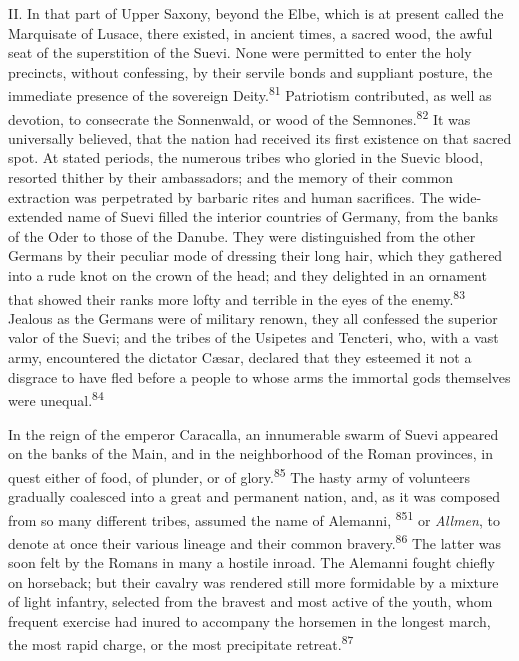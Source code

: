

II. In that part of Upper Saxony, beyond the Elbe, which is at
present called the Marquisate of Lusace, there existed, in
ancient times, a sacred wood, the awful seat of the superstition
of the Suevi. None were permitted to enter the holy precincts,
without confessing, by their servile bonds and suppliant posture,
the immediate presence of the sovereign Deity.\textsuperscript{81} Patriotism
contributed, as well as devotion, to consecrate the Sonnenwald,
or wood of the Semnones.\textsuperscript{82} It was universally believed, that the
nation had received its first existence on that sacred spot. At
stated periods, the numerous tribes who gloried in the Suevic
blood, resorted thither by their ambassadors; and the memory of
their common extraction was perpetrated by barbaric rites and
human sacrifices. The wide-extended name of Suevi filled the
interior countries of Germany, from the banks of the Oder to
those of the Danube. They were distinguished from the other
Germans by their peculiar mode of dressing their long hair, which
they gathered into a rude knot on the crown of the head; and they
delighted in an ornament that showed their ranks more lofty and
terrible in the eyes of the enemy.\textsuperscript{83} Jealous as the Germans were
of military renown, they all confessed the superior valor of the
Suevi; and the tribes of the Usipetes and Tencteri, who, with a
vast army, encountered the dictator Cæsar, declared that they
esteemed it not a disgrace to have fled before a people to whose
arms the immortal gods themselves were unequal.\textsuperscript{84}





In the reign of the emperor Caracalla, an innumerable swarm of
Suevi appeared on the banks of the Main, and in the neighborhood
of the Roman provinces, in quest either of food, of plunder, or
of glory.\textsuperscript{85} The hasty army of volunteers gradually coalesced
into a great and permanent nation, and, as it was composed from
so many different tribes, assumed the name of Alemanni, \textsuperscript{851} or
\textit{Allmen}, to denote at once their various lineage and their
common bravery.\textsuperscript{86} The latter was soon felt by the Romans in many
a hostile inroad. The Alemanni fought chiefly on horseback; but
their cavalry was rendered still more formidable by a mixture of
light infantry, selected from the bravest and most active of the
youth, whom frequent exercise had inured to accompany the
horsemen in the longest march, the most rapid charge, or the most
precipitate retreat.\textsuperscript{87}

